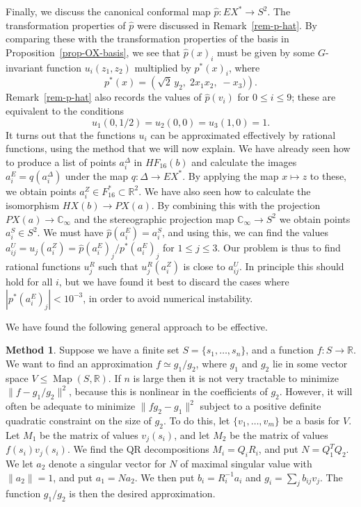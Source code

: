 \documentclass[reqno]{amsart}
\newcommand{\Map}	{\operatorname{Map}}
\newcommand{\Dl}        {\Delta}
\newcommand{\R}         {{\mathbb{R}}}
\newcommand{\C}         {{\mathbb{C}}}
\newcommand{\rt}        {\sqrt{2}}
\newcommand{\hp}        {\widehat{p}}
\renewcommand{\:}{\colon}
\theoremstyle{definition}
\newtheorem{method}[theorem]{Method}
\begin{document}
Finally, we discuss the canonical conformal map $\hp\:EX^*\to S^2$.
The transformation properties of $\hp$ were discussed in
Remark~\ref{rem-p-hat}.  By comparing these with the transformation
properties of the basis in Proposition~\ref{prop-OX-basis}, we see
that $\hp(x)_i$ must be given by some $G$-invariant function
$u_i(z_1,z_2)$ multiplied by $p^*(x)_i$, where 
\[ p^*(x) = \left(\rt \,y_2,\; 2x_1x_2,\; -x_3) \right). \]
Remark~\ref{rem-p-hat} also records the values of $\hp(v_i)$ for
$0\leq i\leq 9$; these are equivalent to the conditions
\[ u_1(0,1/2) = u_2(0,0) = u_3(1,0) = 1. \] 
It turns out that the functions $u_i$ can be approximated effectively
by rational functions, using the method that we will now explain.  We
have already seen how to produce a list of points $a^\Dl_i$ in
$HF_{16}(b)$ and calculate the images $a^E_i=q(a^\Dl_i)$ under the map
$q\:\Dl\to EX^*$.  By applying the map $x\mapsto z$ to these, we
obtain points $a^Z_i\in F^*_{16}\subset\R^2$.  We have also seen how
to calculate the isomorphism $HX(b)\to PX(a)$.  By combining this with
the projection $PX(a)\to\C_\infty$ and the stereographic projection
map $\C_\infty\to S^2$ we obtain points $a_i^S\in S^2$.  We must have
$\hp(a^E_i)=a^S_i$, and using this, we can find the values
$a^U_{ij}=u_j(a^Z_i)=\hp(a^E_i)_j/p^*(a^E_i)_j$ for $1\leq j\leq 3$.
Our problem is thus to find rational functions $u_j^R$ such that
$u_j^R(a^Z_i)$ is close to $a^U_{ij}$.  In principle this should hold
for all $i$, but we have found it best to discard the cases where
$|p^*(a^E_i)_j|<10^{-3}$, in order to avoid numerical instability. 

We have found the following general approach to be effective.
\begin{method}
 Suppose we have a finite set $S=\{s_1,\dotsc,s_n\}$, and a function
 $f\:S\to\R$.  We want to find an approximation $f\simeq g_1/g_2$,
 where $g_1$ and $g_2$ lie in some vector space $V\leq\Map(S,\R)$.  If
 $n$ is large then it is not very tractable to minimize
 $\|f-g_1/g_2\|^2$, because this is nonlinear in the coefficients of
 $g_2$.  However, it will often be adequate to minimize $\|fg_2-g_1\|^2$
 subject to a positive definite quadratic constraint on the size of
 $g_2$.  To do this, let $\{v_1,\dotsc,v_m\}$ be a basis for $V$.  Let
 $M_1$ be the matrix of values $v_j(s_i)$, and let $M_2$ be the matrix
 of values $f(s_i)v_j(s_i)$.  We find the QR decompositions
 $M_i=Q_iR_i$, and put $N=Q_1^TQ_2$.  We let $a_2$ denote a singular
 vector for $N$ of maximal singular value with $\|a_2\|=1$, and put
 $a_1=Na_2$.  We then put $b_i=R_i^{-1}a_i$ and
 $g_i=\sum_jb_{ij}v_j$.  The function $g_1/g_2$ is then the desired
 approximation.
\end{method}
\end{document}
